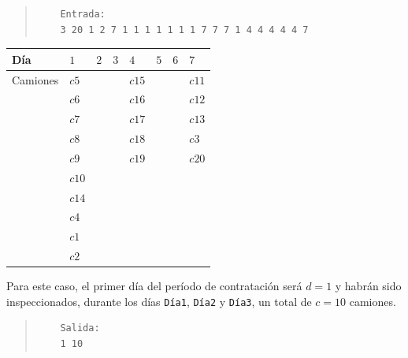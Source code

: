 \documentclass[11pt, a4paper, twoside]{article}
\begin{document}
\begin{ejemplo}\hspace{0em}

  \begin{quote}
    \begin{verbatim}
    Entrada:
    3 20 1 2 7 1 1 1 1 1 1 1 7 7 7 1 4 4 4 4 4 7
    \end{verbatim}
  \end{quote}

  \begin{center}
    \begin{tabular}{|l|l|l|l|l|l|l|l|}
    	\hline
    	Día          &  $1$  & $2$   & $3$   & $4$    & $5$ & $6$ & $7$   \\
    	\hline
    	Camiones     &  $c5$ &       &       & $c15$  &     &     & $c11$ \\
    				 &  $c6$ &       &       & $c16$  &     &     & $c12$ \\    
    				 &	$c7$ &       &       & $c17$  &     &     & $c13$ \\  
    				 &	$c8$ &       &       & $c18$  &     &     & $c3$  \\
    				 &	$c9$ &       &       & $c19$  &     &     & $c20$ \\
    				 &	$c10$&       &       &        &     &     &       \\
    				 &	$c14$&       &       &        &     &     &       \\
    				 &	$c4$ &       &       &        &     &     &       \\
    				 &	$c1$ &       &       &        &     &     &       \\
    				 &	$c2$ &       &       &        &     &     &       \\
    	\hline
    \end{tabular}
  \end{center}

  Para este caso, el primer día del período de contratación será $d=1$ y habrán
  sido inspeccionados, durante los días \texttt{Día1}, \texttt{Día2} y
  \texttt{Día3}, un total de $c=10$ camiones.

  \begin{quote}
    \begin{verbatim}
    Salida:
    1 10
    \end{verbatim}
  \end{quote}

\end{ejemplo}
\end{document}
